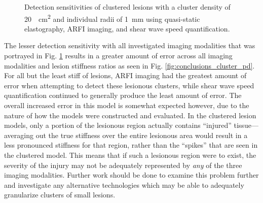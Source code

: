 			\begin{figure}[!htb]
				\centering
				\caption[Detection sensitivities of clustered lesions using the three investigated imaging modalities]{Detection sensitivities of clustered lesions with a cluster density of \SI{20}{\per\cm\squared} and individual radii of \SI{1}{\mm} using quasi-static elastography, ARFI imaging, and shear wave speed quantification.}
				\label{fig:conclusion_cluster}
			\end{figure}

			The lesser detection sensitivity with all investigated imaging modalities that was portrayed in Fig. \ref{fig:conclusion_cluster} results in a greater amount of error across all imaging modalities and lesion stiffness ratios as seen in Fig. \ref{fig:conclusions_cluster_pd}. For all but the least stiff of lesions, ARFI imaging had the greatest amount of error when attempting to detect these lesionous clusters, while shear wave speed quantification continued to generally produce the least amount of error. The overall increased error in this model is somewhat expected however, due to the nature of how the models were constructed and evaluated. In the clustered lesion models, only a portion of the lesionous region actually contains ``injured'' tissue---averaging out the true stiffness over the entire lesionous area would result in a less pronounced stiffness for that region, rather than the ``spikes'' that are seen in the clustered model. This means that if such a lesionous region were to exist, the severity of the injury may not be adequately represented by \emph{any} of the three imaging modalities. Further work should be done to examine this problem further and investigate any alternative technologies which may be able to adequately granularize clusters of small lesions.

